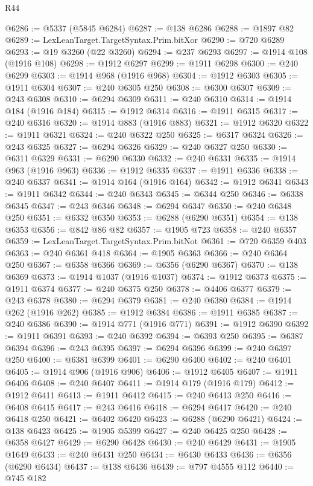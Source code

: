 \begin{lexlean}{R44}
\begin{coremodule}
{@6286 := @5337 (@5845 @6284)
@6287 := @138 @6286
@6288 := @1897 @82
@6289 := LexLeanTarget.TargetSyntax.Prim.bitXor
@6290 := @720 @6289
@6293 := @19 @3260 (@22 @3260)
@6294 := @237 @6293
@6297 := @1914 @108 (@1916 @108)
@6298 := @1912 @6297
@6299 := @1911 @6298
@6300 := @240 @6299
@6303 := @1914 @968 (@1916 @968)
@6304 := @1912 @6303
@6305 := @1911 @6304
@6307 := @240 @6305 @250
@6308 := @6300 @6307
@6309 := @243 @6308
@6310 := @6294 @6309
@6311 := @240 @6310
@6314 := @1914 @184 (@1916 @184)
@6315 := @1912 @6314
@6316 := @1911 @6315
@6317 := @240 @6316
@6320 := @1914 @883 (@1916 @883)
@6321 := @1912 @6320
@6322 := @1911 @6321
@6324 := @240 @6322 @250
@6325 := @6317 @6324
@6326 := @243 @6325
@6327 := @6294 @6326
@6329 := @240 @6327 @250
@6330 := @6311 @6329
@6331 := @6290 @6330
@6332 := @240 @6331
@6335 := @1914 @963 (@1916 @963)
@6336 := @1912 @6335
@6337 := @1911 @6336
@6338 := @240 @6337
@6341 := @1914 @164 (@1916 @164)
@6342 := @1912 @6341
@6343 := @1911 @6342
@6344 := @240 @6343
@6345 := @6344 @250
@6346 := @6338 @6345
@6347 := @243 @6346
@6348 := @6294 @6347
@6350 := @240 @6348 @250
@6351 := @6332 @6350
@6353 := @6288 (@6290 @6351)
@6354 := @138 @6353
@6356 := @842 @86 @82
@6357 := @1905 @723
@6358 := @240 @6357
@6359 := LexLeanTarget.TargetSyntax.Prim.bitNot
@6361 := @720 @6359 @403
@6363 := @240 @6361 @418
@6364 := @1905 @6363
@6366 := @240 @6364 @250
@6367 := @6358 @6366
@6369 := @6356 (@6290 @6367)
@6370 := @138 @6369
@6373 := @1914 @1037 (@1916 @1037)
@6374 := @1912 @6373
@6375 := @1911 @6374
@6377 := @240 @6375 @250
@6378 := @4406 @6377
@6379 := @243 @6378
@6380 := @6294 @6379
@6381 := @240 @6380
@6384 := @1914 @262 (@1916 @262)
@6385 := @1912 @6384
@6386 := @1911 @6385
@6387 := @240 @6386
@6390 := @1914 @771 (@1916 @771)
@6391 := @1912 @6390
@6392 := @1911 @6391
@6393 := @240 @6392
@6394 := @6393 @250
@6395 := @6387 @6394
@6396 := @243 @6395
@6397 := @6294 @6396
@6399 := @240 @6397 @250
@6400 := @6381 @6399
@6401 := @6290 @6400
@6402 := @240 @6401
@6405 := @1914 @906 (@1916 @906)
@6406 := @1912 @6405
@6407 := @1911 @6406
@6408 := @240 @6407
@6411 := @1914 @179 (@1916 @179)
@6412 := @1912 @6411
@6413 := @1911 @6412
@6415 := @240 @6413 @250
@6416 := @6408 @6415
@6417 := @243 @6416
@6418 := @6294 @6417
@6420 := @240 @6418 @250
@6421 := @6402 @6420
@6423 := @6288 (@6290 @6421)
@6424 := @138 @6423
@6425 := @1905 @5399
@6427 := @240 @6425 @250
@6428 := @6358 @6427
@6429 := @6290 @6428
@6430 := @240 @6429
@6431 := @1905 @1649
@6433 := @240 @6431 @250
@6434 := @6430 @6433
@6436 := @6356 (@6290 @6434)
@6437 := @138 @6436
@6439 := @797 @4555 @112
@6440 := @745 @182
}
\end{coremodule}
\end{lexlean}

